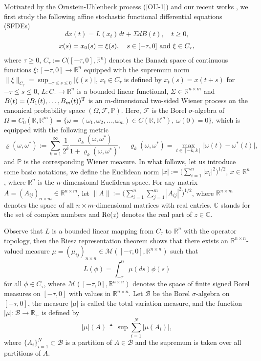 \documentclass[preprint,12pt]{elsarticle}
\begin{document}
Motivated by the Ornstein-Uhlenbeck process (\ref{OU-1}) and our recent works \cite{JL1,Lv}, we first study the following affine stochastic functional differential equations (SFDEs)
\begin{equation}\label{SFDE}
  dx(t)=L(x_t)dt+\Sigma dB(t),\quad t\geq0,
\end{equation}
\begin{equation}\label{SFDE2}x(s)=x_0(s)=\xi(s),\quad s\in[-\tau,0]\ {\rm and}\ \xi\in C_\tau,
\end{equation}
where $\tau\geq0$, $C_\tau:=C\bigl([-\tau,0],\mathbb{R}^n\bigr)$ denotes the Banach space of continuous functions $\xi:[-\tau,0]\rightarrow\mathbb{R}^n$ equipped with the supremum norm $\|\xi\|_{C_\tau}=\sup_{-\tau\leq s\leq0}\bigl|\xi(s)\bigr|$, $x_t\in C_\tau$ is defined by $x_t(s)=x(t+s)$ for $-\tau\leq s\leq 0$, $L:C_\tau\rightarrow\mathbb{R}^n$ is a bounded linear functional, $\Sigma\in\mathbb{R}^{n\times m}$ and $B(t)=(B_1(t),\ldots,B_m(t))^{\rm T}$ is an $m$-dimensional two-sided Wiener process on the canonical probability space $(\Omega,\mathscr{F},\mathbb{P})$. Here, $\mathscr{F}$ is the Borel $\sigma$-algebra of
$\Omega=C_0(\mathbb{R},\mathbb{R}^m)=\bigl\{\omega=(\omega_1,\omega_2,\ldots,\omega_m)\in C(\mathbb{R},\mathbb{R}^m),\ \omega(0)=0\bigr\}$, which is equipped with the following metric
\[\varrho(\omega,\omega^\ast):=\sum_{k=1}^\infty\frac{1}{2^k}\frac{\varrho_k(\omega,\omega^\ast)}{1+\varrho_k(\omega,\omega^\ast)},\quad
\varrho_k(\omega,\omega^\ast)=\max_{t\in[-k,k]}\bigl|\omega(t)-\omega^\ast(t)\bigr|,\]
and $\mathbb{P}$ is the corresponding Wiener measure. In what follows, let us introduce some basic notations, we define the Euclidean norm $|x|:=\bigl(\sum_{i=1}^n|x_i|^2\bigr)^{1/2}$, $x\in\mathbb{R}^n$, where $\mathbb{R}^n$ is the $n$-dimensional Euclidean space. For any  matrix $A=(A_{ij})_{n\times m}\in\mathbb{R}^{n\times m}$, let $\|A\|:=\bigl(\sum_{i=1}^n\sum_{j=1}^m|A_{ij}|^2\bigr)^{1/2}$, where $\mathbb{R}^{n\times m}$ denotes the space of all $n\times m$-dimensional matrices with real entries. $\mathbb{C}$ stands for the set of complex numbers and ${\rm Re}(z)$ denotes the real part of $z\in\mathbb{C}$.

Observe that $L$ is a bounded linear mapping from $C_\tau$ to $\mathbb{R}^n$ with the operator topology, then the Riesz representation theorem shows that there exists an $\mathbb{R}^{n\times n}$-valued measure $\mu=(\mu_{ij})_{n\times n}\in\mathscr{M}([-\tau,0],\mathbb{R}^{n\times n})$ such that
\begin{equation}\label{Riesz}
L(\phi)=\int_{-\tau}^{0}\mu(ds)\phi(s)
\end{equation}
for all $\phi\in C_\tau$, where $\mathscr{M}([-\tau,0],\mathbb{R}^{n\times n})$ denotes the space of finite signed Borel measures on $[-\tau,0]$ with values in $\mathbb{R}^{n\times n}$. Let $\mathscr{B}$ be the Borel $\sigma$-algebra on $[-\tau,0]$, the measure $|\mu|$ is called the total variation measure, and the function $|\mu|:\mathscr{B}\rightarrow\mathbb{R}_+$ is defined by
\[|\mu|(A)\triangleq\sup\sum_{i=1}^{N}|\mu(A_i)|,\]
where $\{A_i\}_{i=1}^{N}\subset\mathscr{B}$ is a partition of $A\in\mathscr{B}$ and the supremum is taken over all partitions of $A$.
\end{document}
